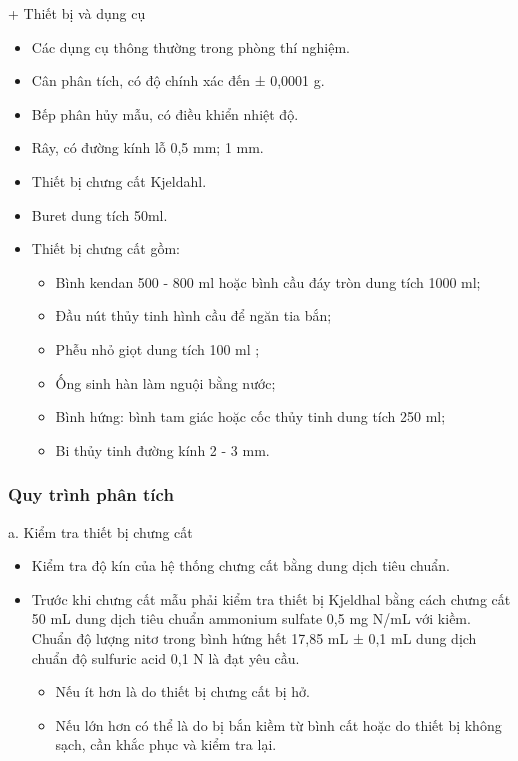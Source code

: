 + Thiết bị và dụng cụ
\begin{itemize}
  \item Các dụng cụ thông thường trong phòng thí nghiệm.
  \item Cân phân tích, có độ chính xác đến ± 0,0001 g.
  \item Bếp phân hủy mẫu, có điều khiển nhiệt độ.
  \item Rây, có đường kính lỗ 0,5 mm; 1 mm.
  \item Thiết bị chưng cất Kjeldahl.
  \item Buret dung tích 50ml.
  \item Thiết bị chưng cất gồm: \begin{itemize}
    \item Bình kendan 500 - 800 ml hoặc bình cầu đáy tròn dung tích 1000 ml;
    \item Đầu nút thủy tinh hình cầu để ngăn tia bắn;
    \item Phễu nhỏ giọt dung tích 100 ml ;
    \item Ống sinh hàn làm nguội bằng nước;
    \item Bình hứng: bình tam giác hoặc cốc thủy tinh dung tích 250 ml;
    \item Bi thủy tinh đường kính 2 - 3 mm.
  \end{itemize}
\end{itemize}

\subsubsection{Quy trình phân tích}

a. Kiểm tra thiết bị chưng cất
\begin{itemize}
  \item Kiểm tra độ kín của hệ thống chưng cất bằng dung dịch tiêu chuẩn.
  \item Trước khi chưng cất mẫu phải kiểm tra thiết bị Kjeldhal bằng cách chưng cất 50 mL dung dịch tiêu chuẩn ammonium sulfate 0,5 mg N/mL với kiềm.
  Chuẩn độ lượng nitơ trong bình hứng hết 17,85 mL ± 0,1 mL dung dịch chuẩn độ sulfuric acid 0,1 N là đạt yêu cầu. 
  \begin{itemize}
    \item Nếu ít hơn là do thiết bị chưng cất bị hở.
    \item Nếu lớn hơn có thể là do bị bắn kiềm từ bình cất hoặc do thiết bị không sạch, cần khắc phục và kiểm tra lại.
  \end{itemize}
\end{itemize}

